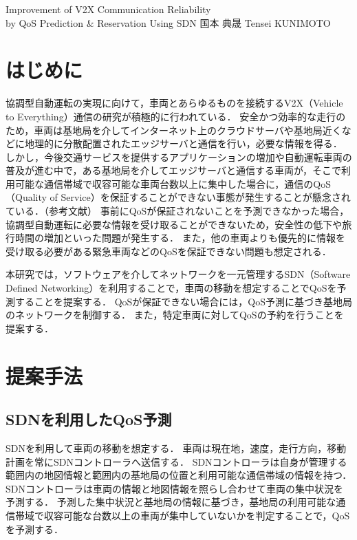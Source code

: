 \documentclass[a4paper,10pt,twocolumn,uplatex]{jsarticle}
\date{8}
\begin{document}
{Improvement of V2X Communication Reliability\\by QoS Prediction \& Reservation Using SDN}
{国本 典晟}
{Tensei KUNIMOTO}

\section{はじめに}
協調型自動運転の実現に向けて，車両とあらゆるものを接続するV2X（Vehicle to Everything）通信の研究が積極的に行われている．
安全かつ効率的な走行のため，車両は基地局を介してインターネット上のクラウドサーバや基地局近くなどに地理的に分散配置されたエッジサーバと通信を行い，必要な情報を得る．
しかし，今後交通サービスを提供するアプリケーションの増加や自動運転車両の普及が進む中で，ある基地局を介してエッジサーバと通信する車両が，そこで利用可能な通信帯域で収容可能な車両台数以上に集中した場合に，通信のQoS（Quality of Service）を保証することができない事態が発生することが懸念されている．（参考文献）
事前にQoSが保証されないことを予測できなかった場合，協調型自動運転に必要な情報を受け取ることができないため，安全性の低下や旅行時間の増加といった問題が発生する．
また，他の車両よりも優先的に情報を受け取る必要がある緊急車両などのQoSを保証できない問題も想定される．\par
本研究では，ソフトウェアを介してネットワークを一元管理するSDN（Software Defined Networking）を利用することで，車両の移動を想定することでQoSを予測することを提案する．
QoSが保証できない場合には，QoS予測に基づき基地局のネットワークを制御する．
また，特定車両に対してQoSの予約を行うことを提案する．

\section{提案手法}
\subsection{SDNを利用したQoS予測}
\label{QoSprediction}
SDNを利用して車両の移動を想定する．
車両は現在地，速度，走行方向，移動計画を常にSDNコントローラへ送信する．
SDNコントローラは自身が管理する範囲内の地図情報と範囲内の基地局の位置と利用可能な通信帯域の情報を持つ．
SDNコントローラは車両の情報と地図情報を照らし合わせて車両の集中状況を予測する．
予測した集中状況と基地局の情報に基づき，基地局の利用可能な通信帯域で収容可能な台数以上の車両が集中していないかを判定することで，QoSを予測する．
\end{document}
